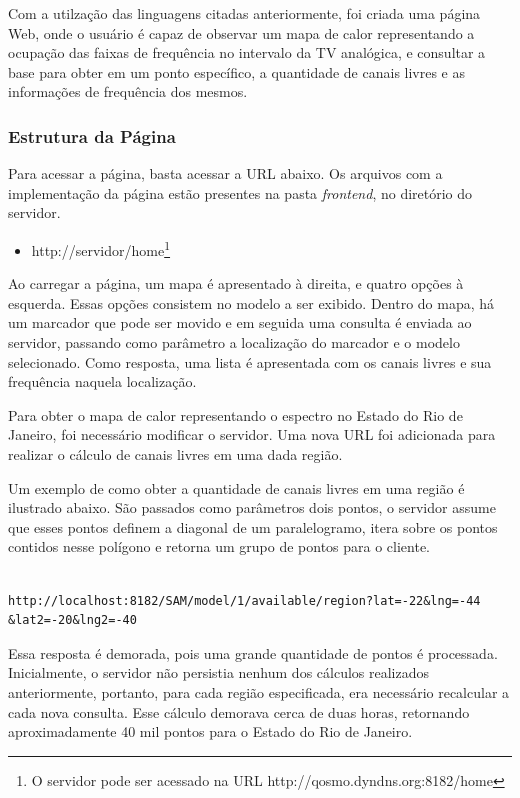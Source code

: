 Com a utilzação das linguagens citadas anteriormente, foi criada uma página Web, onde o usuário é capaz de observar um mapa de calor representando a ocupação das faixas de frequência no intervalo da TV analógica, e consultar a base para obter em um ponto específico, a quantidade de canais livres e as informações de frequência dos mesmos.


\subsubsection{Estrutura da Página}

Para acessar a página, basta acessar a URL abaixo. Os arquivos com a implementação da página estão presentes na pasta \textit{frontend}, no diretório do servidor.

\begin{itemize}
\item http://servidor/home\footnote{O servidor pode ser acessado na URL http://qosmo.dyndns.org:8182/home}
\end{itemize}

Ao carregar a página, um mapa é apresentado à direita, e quatro opções à esquerda. Essas opções consistem no modelo a ser exibido. Dentro do mapa, há um marcador que pode ser movido e em seguida uma consulta é enviada ao servidor, passando como parâmetro a localização do marcador e o modelo selecionado. Como resposta, uma lista é apresentada com os canais livres e sua frequência naquela localização.

Para obter o mapa de calor representando o espectro no Estado do Rio de Janeiro, foi necessário modificar o servidor. Uma nova URL foi adicionada para realizar o cálculo de canais livres em uma dada região.

Um exemplo de como obter a quantidade de canais livres em uma região é ilustrado abaixo. São passados como parâmetros dois pontos, o servidor assume que esses pontos definem a diagonal de um paralelogramo, itera sobre os pontos contidos nesse polígono e retorna um grupo de pontos para o cliente.


\begin{lstlisting}			

http://localhost:8182/SAM/model/1/available/region?lat=-22&lng=-44
&lat2=-20&lng2=-40

\end{lstlisting}

Essa resposta é demorada, pois uma grande quantidade de pontos é processada. Inicialmente, o servidor não persistia nenhum dos cálculos realizados anteriormente, portanto, para cada região especificada, era necessário recalcular a cada nova consulta. Esse cálculo demorava cerca de duas horas, retornando aproximadamente 40 mil pontos para o Estado do Rio de Janeiro.

